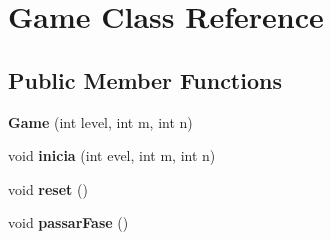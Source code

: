 \hypertarget{classGame}{\section{\-Game \-Class \-Reference}
\label{classGame}
}
\subsection*{\-Public \-Member \-Functions}
\begin{DoxyCompactItemize}
\item 
\hypertarget{classGame_af0c00524acfb97acbd67b6aeab39ff3c}{{\bfseries \-Game} (int level, int m, int n)}\label{classGame_af0c00524acfb97acbd67b6aeab39ff3c}

\item 
\hypertarget{classGame_a0ecf1594237ae09419dc231785c5605f}{void {\bfseries inicia} (int evel, int m, int n)}\label{classGame_a0ecf1594237ae09419dc231785c5605f}

\item 
\hypertarget{classGame_a39bb2fd26b5ea6b164f28f9f6723582e}{void {\bfseries reset} ()}\label{classGame_a39bb2fd26b5ea6b164f28f9f6723582e}

\item 
\hypertarget{classGame_a5b3d154e328181f01f94af12fb050788}{void {\bfseries passar\-Fase} ()}\label{classGame_a5b3d154e328181f01f94af12fb050788}

\end{DoxyCompactItemize}
